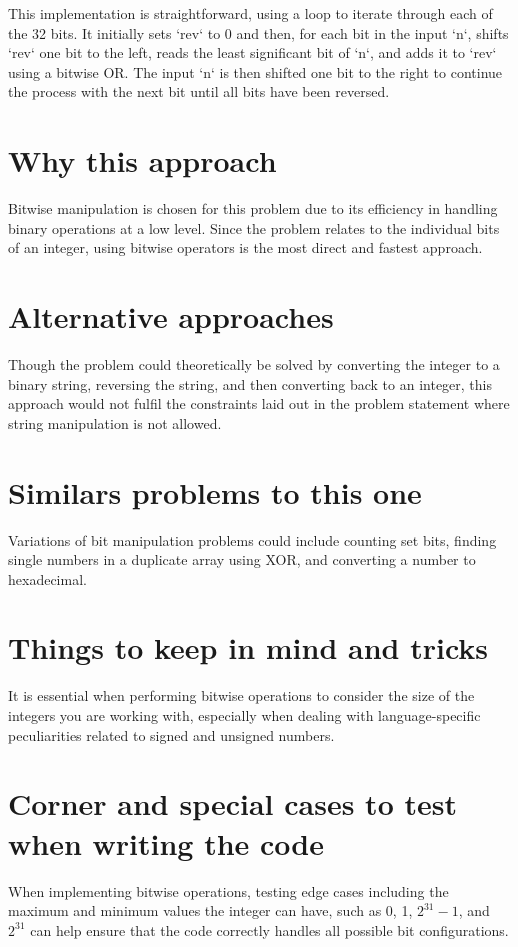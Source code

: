 This implementation is straightforward, using a loop to iterate through each of the 32 bits. It initially sets `rev` to 0 and then, for each bit in the input `n`, shifts `rev` one bit to the left, reads the least significant bit of `n`, and adds it to `rev` using a bitwise OR. The input `n` is then shifted one bit to the right to continue the process with the next bit until all bits have been reversed.

\section*{Why this approach}
Bitwise manipulation is chosen for this problem due to its efficiency in handling binary operations at a low level. Since the problem relates to the individual bits of an integer, using bitwise operators is the most direct and fastest approach.

\section*{Alternative approaches}
Though the problem could theoretically be solved by converting the integer to a binary string, reversing the string, and then converting back to an integer, this approach would not fulfil the constraints laid out in the problem statement where string manipulation is not allowed.

\section*{Similars problems to this one}
Variations of bit manipulation problems could include counting set bits, finding single numbers in a duplicate array using XOR, and converting a number to hexadecimal.

\section*{Things to keep in mind and tricks}
It is essential when performing bitwise operations to consider the size of the integers you are working with, especially when dealing with language-specific peculiarities related to signed and unsigned numbers.

\section*{Corner and special cases to test when writing the code}
When implementing bitwise operations, testing edge cases including the maximum and minimum values the integer can have, such as 0, 1, \(2^{31} - 1\), and \(2^{31}\) can help ensure that the code correctly handles all possible bit configurations.